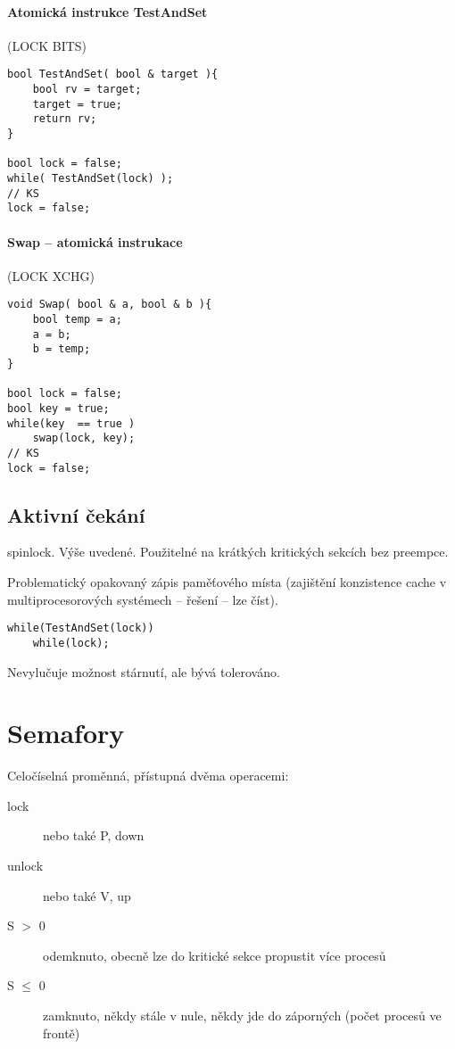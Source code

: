 \documentclass[a4wide]{report}
\begin{document}
\paragraph{Atomická instrukce TestAndSet} (LOCK BITS)

\begin{lstlisting}
bool TestAndSet( bool & target ){
	bool rv = target;
	target = true;
	return rv;
}

bool lock = false;
while( TestAndSet(lock) );
// KS
lock = false;
\end{lstlisting}

\paragraph{Swap -- atomická instrukace} (LOCK XCHG)

\begin{lstlisting}
void Swap( bool & a, bool & b ){
	bool temp = a;
	a = b;
	b = temp;
}

bool lock = false;
bool key = true;
while(key  == true )
	swap(lock, key);
// KS
lock = false;
\end{lstlisting}

\subsection{Aktivní čekání}
spinlock. Výše uvedené. Použitelné na krátkých kritických sekcích bez preempce.

Problematický opakovaný zápis paměťového místa (zajištění konzistence cache v multiprocesorových systémech -- řešení -- lze číst).

\begin{lstlisting}
while(TestAndSet(lock))
	while(lock);
\end{lstlisting}
Nevylučuje možnost stárnutí, ale bývá tolerováno.

\section{Semafory}

Celočíselná proměnná, přístupná dvěma operacemi:
\begin{description}
	\item[lock] nebo také P, down
	\item[unlock] nebo také V, up
\end{description}

\begin{description}
	\item[S $>$ 0] odemknuto, obecně lze do kritické sekce propustit více procesů
	\item[S $\leq$ 0] zamknuto, někdy stále v nule, někdy jde do záporných (počet procesů ve frontě)
\end{description}
\end{document}

